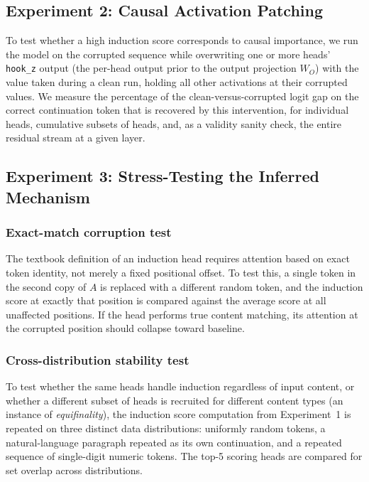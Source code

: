 \documentclass[conference]{IEEEtran}
\begin{document}
\subsection{Experiment 2: Causal Activation Patching}

To test whether a high induction score corresponds to causal importance, we run the model on the corrupted sequence while overwriting one or more heads' \texttt{hook\_z} output (the per-head output prior to the output projection $W_O$) with the value taken during a clean run, holding all other activations at their corrupted values. We measure the percentage of the clean-versus-corrupted logit gap on the correct continuation token that is recovered by this intervention, for individual heads, cumulative subsets of heads, and, as a validity sanity check, the entire residual stream at a given layer.

\subsection{Experiment 3: Stress-Testing the Inferred Mechanism}

\subsubsection{Exact-match corruption test}
The textbook definition of an induction head requires attention based on exact token identity, not merely a fixed positional offset. To test this, a single token in the second copy of $A$ is replaced with a different random token, and the induction score at exactly that position is compared against the average score at all unaffected positions. If the head performs true content matching, its attention at the corrupted position should collapse toward baseline.

\subsubsection{Cross-distribution stability test}
To test whether the same heads handle induction regardless of input content, or whether a different subset of heads is recruited for different content types (an instance of \emph{equifinality}), the induction score computation from Experiment~1 is repeated on three distinct data distributions: uniformly random tokens, a natural-language paragraph repeated as its own continuation, and a repeated sequence of single-digit numeric tokens. The top-5 scoring heads are compared for set overlap across distributions.
\end{document}
